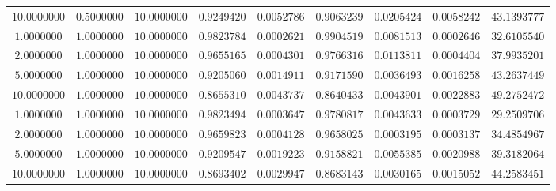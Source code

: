\begin{tabular}{ccccccccc}
$10.0000000$ & $0.5000000$ & $10.0000000$ & $0.9249420$ & $0.0052786$ & $0.9063239$ & $0.0205424$ & $0.0058242$ & $43.1393777$\\
$1.0000000$ & $1.0000000$ & $10.0000000$ & $0.9823784$ & $0.0002621$ & $0.9904519$ & $0.0081513$ & $0.0002646$ & $32.6105540$\\
$2.0000000$ & $1.0000000$ & $10.0000000$ & $0.9655165$ & $0.0004301$ & $0.9766316$ & $0.0113811$ & $0.0004404$ & $37.9935201$\\
$5.0000000$ & $1.0000000$ & $10.0000000$ & $0.9205060$ & $0.0014911$ & $0.9171590$ & $0.0036493$ & $0.0016258$ & $43.2637449$\\
$10.0000000$ & $1.0000000$ & $10.0000000$ & $0.8655310$ & $0.0043737$ & $0.8640433$ & $0.0043901$ & $0.0022883$ & $49.2752472$\\
$1.0000000$ & $1.0000000$ & $10.0000000$ & $0.9823494$ & $0.0003647$ & $0.9780817$ & $0.0043633$ & $0.0003729$ & $29.2509706$\\
$2.0000000$ & $1.0000000$ & $10.0000000$ & $0.9659823$ & $0.0004128$ & $0.9658025$ & $0.0003195$ & $0.0003137$ & $34.4854967$\\
$5.0000000$ & $1.0000000$ & $10.0000000$ & $0.9209547$ & $0.0019223$ & $0.9158821$ & $0.0055385$ & $0.0020988$ & $39.3182064$\\
$10.0000000$ & $1.0000000$ & $10.0000000$ & $0.8693402$ & $0.0029947$ & $0.8683143$ & $0.0030165$ & $0.0015052$ & $44.2583451$\\
\end{tabular}
